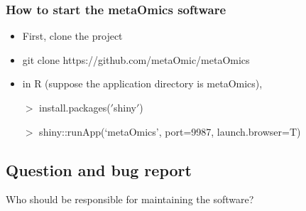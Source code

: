\subsubsection{How to start the metaOmics software}
\begin{itemize}
\item First, clone the project
\item git clone https://github.com/metaOmic/metaOmics
\item in R (suppose the application directory is metaOmics),

$>$ install.packages($'$shiny$'$)

$>$ shiny::runApp(`metaOmics', port=9987, launch.browser=T)
\end{itemize}



\subsection{Question and bug report}
{
\color{red}
Who should be responsible for maintaining the software?
}

 
